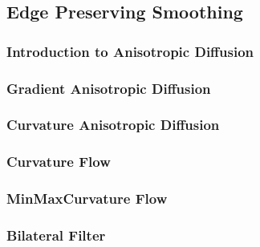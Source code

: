 



\subsection{Edge Preserving Smoothing}
\label{sec:EdgePreservingSmoothingFilters}

\subsubsection{Introduction to Anisotropic Diffusion}
\label{sec:IntroductionAnisotropicDiffusion}



\subsubsection{Gradient Anisotropic Diffusion}
\label{sec:GradientAnisotropicDiffusionImageFilter}





\subsubsection{Curvature Anisotropic Diffusion}
\label{sec:CurvatureAnisotropicDiffusionImageFilter}



\subsubsection{Curvature Flow}
\label{sec:CurvatureFlowImageFilter}



\subsubsection{MinMaxCurvature Flow}
\label{sec:MinMaxCurvatureFlowImageFilter}




\subsubsection{Bilateral Filter}
\label{sec:BilateralImageFilter}


